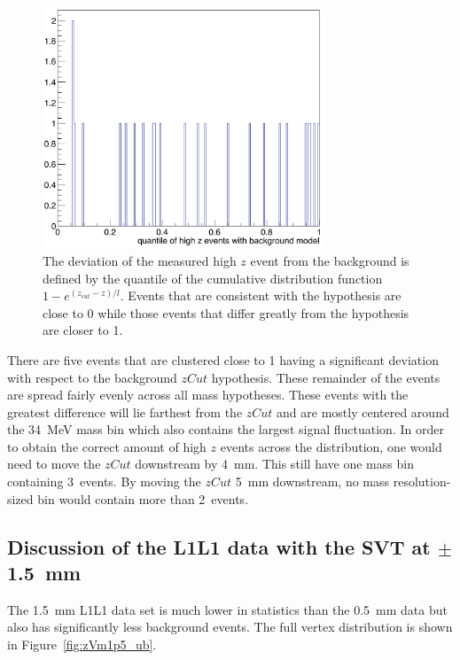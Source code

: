 \begin{figure}[htb]
  \centering
      \includegraphics[width=0.75\textwidth]{pics/results/highz_quantiles.png}
  \caption[Deviation of the measured high $z$ event from the background $zCut$]{The deviation of the measured high $z$ event from the background is defined by the quantile of the cumulative distribution function $1-e^{(z_{cut}-z)/l}$. Events that are consistent with the hypothesis are close to 0 while those events that differ greatly from the hypothesis are closer to 1.}
  \label{fig:highz_quantile}
\end{figure} 

There are five events that are clustered close to 1 having a significant deviation with respect to the background $zCut$ hypothesis. These remainder of the events are spread fairly evenly across all mass hypotheses. These events with the greatest difference will lie farthest from the $zCut$ and are mostly centered around the 34~MeV mass bin which also contains the largest signal fluctuation. In order to obtain the correct amount of high $z$ events across the distribution, one would need to move the $zCut$ downstream by 4~mm. This still have one mass bin containing 3~events. By moving the $zCut$ 5~mm downstream, no mass resolution-sized bin would contain more than 2~events. 

\subsection{Discussion of the L1L1 data with the SVT at $\pm$1.5~mm}
The 1.5~mm L1L1 data set is much lower in statistics than the 0.5~mm data but also has significantly less background events. The full vertex distribution is shown in Figure~\ref{fig:zVm1p5_ub}.

